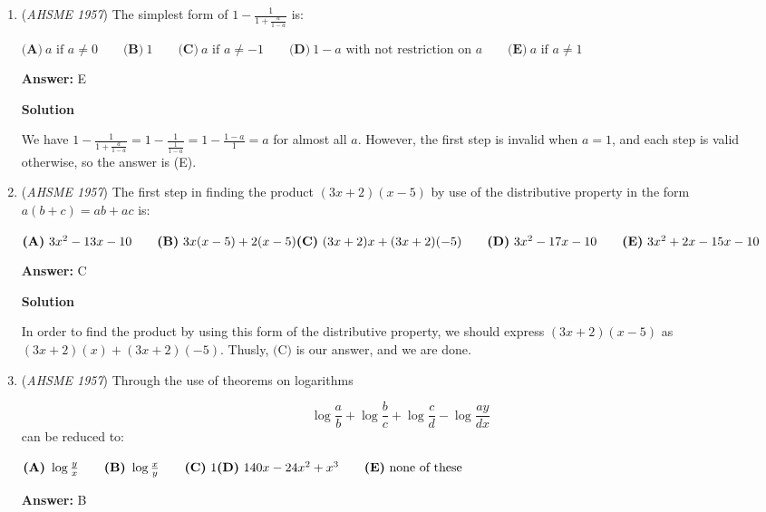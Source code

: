\begin{enumerate}
 Thus, our answer is $\boxed{\textbf{(E) } 8 \text{ and } -3}$.

 


	\item (\textit{AHSME 1957}) The simplest form of $1 - \frac{1}{1 + \frac{a}{1 - a}}$ is: 


 $\textbf{(A)}\ {a}\text{ if }{a\not= 0} \qquad \textbf{(B)}\ 1\qquad  \textbf{(C)}\ {a}\text{ if }{a\not=-1}\qquad \textbf{(D)}\ {1-a}\text{ with not restriction on }{a}\qquad \textbf{(E)}\ {a}\text{ if }{a\not= 1}$

 \textbf{Answer: }E



\textbf{Solution}

We have $1 - \frac{1}{1 + \frac{a}{1 - a}} = 1 - \frac{1}{\frac{1}{1-a}} = 1 - \frac{1-a}{1} = a$ for almost all $a$. However, the first step is invalid when $a=1$, and each step is valid otherwise, so the answer is (E).

 


	\item (\textit{AHSME 1957}) The first step in finding the product $(3x + 2)(x - 5)$ by use of the distributive property in the form $a(b + c) = ab + ac$ is: 


 $\textbf{(A)}\ 3x^2 - 13x - 10 \qquad  \textbf{(B)}\ 3x(x - 5) + 2(x - 5)\qquad \\ \textbf{(C)}\ (3x+2)x+(3x+2)(-5)\qquad \textbf{(D)}\ 3x^2-17x-10\qquad \textbf{(E)}\ 3x^2+2x-15x-10$

 \textbf{Answer: }C



\textbf{Solution}

In order to find the product by using this form of the distributive property, we should express $(3x + 2)(x - 5)$ as $(3x + 2)(x) + (3x + 2)(-5)$. Thusly, $\boxed{\text{(C)}}$ is our answer, and we are done.

 


	\item (\textit{AHSME 1957}) Through the use of theorems on logarithms 

 \[\log{\frac{a}{b}} + \log{\frac{b}{c}} + \log{\frac{c}{d}} - \log{\frac{ay}{dx}}\]
can be reduced to: 


 $\textbf{(A)}\ \log{\frac{y}{x}}\qquad  \textbf{(B)}\ \log{\frac{x}{y}}\qquad  \textbf{(C)}\ 1\qquad \\ \textbf{(D)}\ 140x-24x^2+x^3\qquad \textbf{(E)}\ \text{none of these}$

 \textbf{Answer: }B




\end{enumerate}
